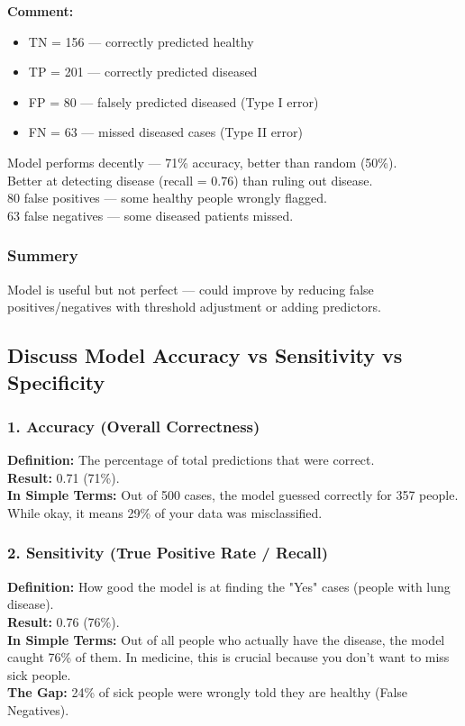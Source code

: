 \documentclass[a4paper,12pt]{article}
\begin{document}

\textbf{Comment:}
\begin{itemize}
	\item TN = 156 — correctly predicted healthy
	\item TP = 201 — correctly predicted diseased
	\item FP = 80 — falsely predicted diseased (Type I error)
	\item FN = 63 — missed diseased cases (Type II error)
\end{itemize}

 Model performs decently — 71\% accuracy, better than random (50\%).  \\
 Better at detecting disease (recall = 0.76) than ruling out disease.\\  
 80 false positives — some healthy people wrongly flagged.\\
 63 false negatives — some diseased patients missed.
\subsubsection{Summery}
Model is useful but not perfect — could improve by reducing false 
positives/negatives with threshold adjustment or adding predictors. 

\subsection{Discuss Model Accuracy vs Sensitivity vs Specificity}

\subsubsection{1. Accuracy (Overall Correctness)}
\textbf{Definition:} The percentage of total predictions that were correct.  \\
\textbf{Result:} 0.71 (71\%).  \\
\textbf{In Simple Terms:} Out of 500 cases, the model guessed correctly for 357 people. While okay, it means 29\% of your data was misclassified.\\


\subsubsection{2. Sensitivity (True Positive Rate / Recall)}
\textbf{Definition:} How good the model is at finding the "Yes" cases (people with lung disease).\\  
\textbf{Result:} 0.76 (76\%). \\ 
\textbf{In Simple Terms:} Out of all people who actually have the disease, the model caught 76\% of them. In medicine, this is crucial because you don't want to miss sick people.  \\
\textbf{The Gap:} 24\% of sick people were wrongly told they are healthy (False Negatives).
\end{document}
